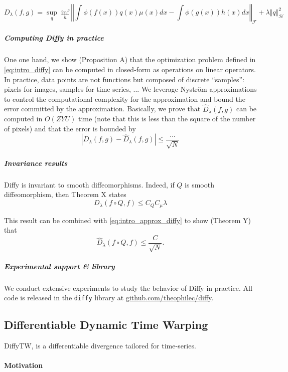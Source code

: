 \begin{equation}\label{eq:intro_diffy}
D_\lambda(f, g) = \sup_q \inf_h \left \Vert \int \phi(f(x))q(x)\mu(x)dx - \int\phi(g(x))h(x)dx\right \Vert_\mathcal F + \lambda \Vert q\Vert_\mathcal H^2
\end{equation}


\subparagraph{Computing Diffy in practice}
One one hand, we show (Proposition A) that the optimization problem defined in \cref{eq:intro_diffy} can be computed in closed-form as operations on linear operators. In practice, data points are not functions but composed of discrete ``samples'': pixels for images, samples for time series, ... We leverage Nystr\"om approximations to control the computational complexity for the approximation and bound the error committed by the approximation. Basically, we prove that $\hat D_\lambda(f, g)$ can be computed in $O(ZYU)$ time (note that this is less than the square of the number of pixels) and that the error is bounded by
\begin{equation}\label{eq:intro_approx_diffy}
\left\vert D_\lambda(f, g) - \hat D_\lambda(f, g)\right\vert \leq \frac{...}{\sqrt{N}}
\end{equation}


\subparagraph{Invariance results}
Diffy is invariant to smooth diffeomorphisms. Indeed, if $Q$ is smooth diffeomorphism, then Theorem X states
\begin{equation}
D_\lambda(f\circ Q, f) \leq C_QC_\mu\lambda
\end{equation}

This result can be combined with \cref{eq:intro_approx_diffy} to show (Theorem Y) that
\begin{equation}
\hat D_\lambda(f\circ Q, f) \leq \frac{C}{\sqrt{N}}.
\end{equation}

\subparagraph{Experimental support \& library}

We conduct extensive experiments to study the behavior of Diffy in practice. All code is released in the \texttt{diffy} library at \url{github.com/theophilec/diffy}.

\newpage
\subsection{Differentiable Dynamic Time Warping}
DiffyTW, is a differentiable divergence tailored for time-series.

\paragraph{Motivation}

